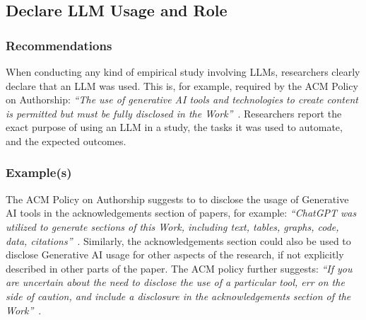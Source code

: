 



\subsection{Declare LLM Usage and Role}

\subsubsection{Recommendations}

When conducting any kind of empirical study involving LLMs, researchers \must clearly declare that an LLM was used.
This is, for example, required by the ACM Policy on Authorship: \emph{``The use of generative AI tools and technologies to create content is permitted but must be fully disclosed in the Work''}~\cite{ACM2023}.
Researchers \should report the exact purpose of using an LLM in a study, the tasks it was used to automate, and the expected outcomes.


\subsubsection{Example(s)}

The ACM Policy on Authorship suggests to to disclose the usage of Generative AI tools in the acknowledgements section of papers, for example: \emph{``ChatGPT was utilized to generate sections of this Work, including text, tables, graphs, code, data, citations''}~\cite{ACM2023}. 
Similarly, the acknowledgements section could also be used to disclose Generative AI usage for other aspects of the research, if not explicitly described in other parts of the paper.
The ACM policy further suggests: \emph{``If you are uncertain ­about the need to disclose the use of a particular tool, err on the side of caution, and include a disclosure in the acknowledgements section of the Work''}~\cite{ACM2023}.

